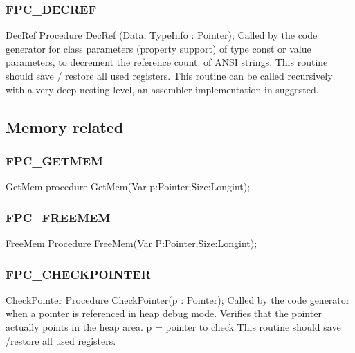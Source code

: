 \documentclass [a4paper,12pt]{article}
\begin{document}
\subsubsection{FPC{\_}DECREF}
\label{subsubsec:mylabel74}

\begin{procedure}{DecRef}
\Declaration
Procedure DecRef (Data, TypeInfo : Pointer);
\Description
Called by the code generator for class parameters (property support) of type
const or value parameters, to decrement the reference count. of ANSI
strings.
\Parameters
\Notes
This routine should save / restore all used registers. This routine can be
called recursively with a very deep nesting level, an assembler
implementation in suggested.
\end{procedure}

\subsection{Memory related}
\label{subsec:memory}

\subsubsection{FPC{\_}GETMEM}
\label{subsubsec:mylabel75}

\begin{procedure}{GetMem}
\Declaration
procedure GetMem(Var p:Pointer;Size:Longint);
\end{procedure}

\subsubsection{FPC{\_}FREEMEM}
\label{subsubsec:mylabel76}

\begin{procedure}{FreeMem}
\Declaration
Procedure FreeMem(Var P:Pointer;Size:Longint);
\end{procedure}

\subsubsection{FPC{\_}CHECKPOINTER}
\label{subsubsec:mylabel77}

\begin{function}{CheckPointer}
\Declaration
Procedure CheckPointer(p : Pointer);
\Description
Called by the code generator when a pointer is referenced in heap debug
mode. Verifies that the pointer actually points in the heap area.
\Parameters
p = pointer to check
\Notes
This routine should save /restore all used registers.
\end{function}
\end{document}
